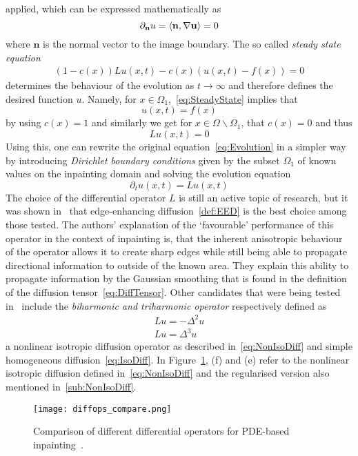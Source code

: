 applied, which can be expressed mathematically as 
\begin{equation*}
    \partial_\mathbf{n}u = \langle \mathbf{n}, \mathbf{\nabla} \mathbf{u} \rangle = 0
\end{equation*}
where $ \mathbf{n}$ is the normal vector to the image boundary.
The so called \textit{steady state equation}
\begin{align}
    (1 - c(x))Lu(x,t)- c(x)(u(x, t) - f(x)) = 0\label{eq:SteadyState}
\end{align}
determines the behaviour of the evolution as $t\to\infty$ and therefore defines the desired
function $u$. Namely, for $x\in\Omega_1$,~\eqref{eq:SteadyState} implies that 
\[ u(x,t) = f(x) \]
by using $c(x) = 1$ and similarly we get for $x\in\Omega\backslash\Omega_1$, that $c(x) = 0$ and
thus
\[ Lu(x, t) = 0 \]
Using this, one can rewrite the original equation~\eqref{eq:Evolution} in a simpler way by
introducing \textit{Dirichlet boundary conditions} given by the subset $\Omega_1$ of known values on the 
inpainting domain and solving the evolution equation
\begin{equation}
    \partial_t u(x,t) = Lu(x, t)
\end{equation}
The choice of the differential operator $L$ is still an active topic of
research, but it was shown in~\cite{schmaltz14} that edge-enhancing diffusion~\eqref{def:EED} is the best choice
among those tested.
The authors' explanation of the `favourable' performance of this operator in the context of
inpainting is, that the inherent anisotropic behaviour of the operator allows it to create sharp
edges while still being able to propagate directional information to outside of the known area.
They explain this ability to propagate information by the Gaussian smoothing that is found in the
definition of the diffusion tensor~\eqref{eq:DiffTensor}.
Other candidates that were being tested in~\cite{schmaltz14} include the \textit{biharmonic
and triharmonic operator} respectively defined as
\begin{eqnarray*}
    Lu = -\Delta^2u\\
    Lu = \Delta^3u
\end{eqnarray*}
a nonlinear isotropic diffusion operator as described in~\eqref{eq:NonIsoDiff} and simple
homogeneous diffusion~\eqref{eq:IsoDiff}.\newpage\noindent
In Figure~\ref{fig:DiffOpsCompare}, (f) and (e) refer to the nonlinear isotropic diffusion defined
in~\eqref{eq:NonIsoDiff} and the regularised version also mentioned in~\ref{sub:NonIsoDiff}.
\begin{figure}[h]
    \centering
    \texttt{[image: diffops\_compare.png]}
    \caption{Comparison of different differential operators for PDE-based
    inpainting~\cite{schmaltz14}.}\label{fig:DiffOpsCompare}
\end{figure}
